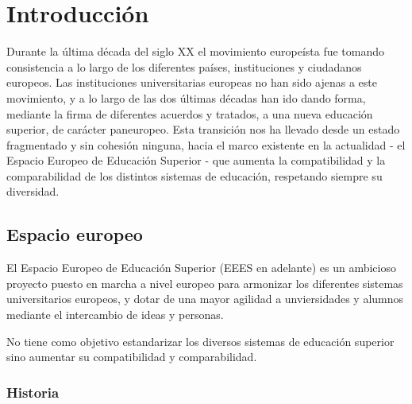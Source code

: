 \chapter{Introducción}

Durante la última década del siglo XX el movimiento europeísta fue tomando consistencia a lo largo de los diferentes países, instituciones y ciudadanos europeos. Las instituciones universitarias europeas no han sido ajenas a este movimiento, y a lo largo de las dos últimas décadas han ido dando forma, mediante la firma de diferentes acuerdos y tratados, a una nueva educación superior, de carácter paneuropeo. Esta transición nos ha llevado desde un estado fragmentado y sin cohesión ninguna, hacia el marco existente en la actualidad - el Espacio Europeo de Educación Superior - que aumenta la compatibilidad y la comparabilidad de los distintos sistemas de educación, respetando siempre su diversidad.
	

\section{Espacio europeo}
El Espacio Europeo de Educación Superior (EEES en adelante) es un ambicioso proyecto puesto en marcha a nivel europeo para armonizar los diferentes sistemas universitarios europeos, y dotar de una mayor agilidad a unviersidades y alumnos mediante el intercambio de ideas y personas. 

No tiene como objetivo estandarizar los diversos sistemas de educación superior sino aumentar su compatibilidad y comparabilidad. 

	\subsection{Historia}

